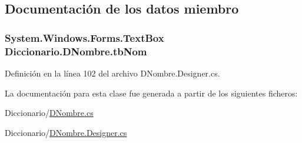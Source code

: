 \subsection{Documentación de los datos miembro}
\hypertarget{class_diccionario_1_1_d_nombre_a7cbf78c3ddfbd2f70b62d515eafb5c82}{
\subsubsection[{tb\-Nom}]{\setlength{\rightskip}{0pt plus 5cm}System.\-Windows.\-Forms.\-Text\-Box Diccionario.\-D\-Nombre.\-tb\-Nom}}\label{class_diccionario_1_1_d_nombre_a7cbf78c3ddfbd2f70b62d515eafb5c82}


Definición en la línea 102 del archivo D\-Nombre.\-Designer.\-cs.



La documentación para esta clase fue generada a partir de los siguientes ficheros\-:\begin{DoxyCompactItemize}
\item 
Diccionario/\hyperlink{_d_nombre_8cs}{D\-Nombre.\-cs}\item 
Diccionario/\hyperlink{_d_nombre_8_designer_8cs}{D\-Nombre.\-Designer.\-cs}\end{DoxyCompactItemize}
